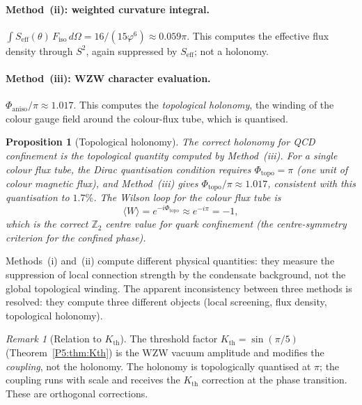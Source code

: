 \documentclass[11pt,a4paper]{article}
\newtheorem{proposition}[theorem]{Proposition}
\theoremstyle{definition}
\theoremstyle{remark}
\newtheorem{remark}[theorem]{Remark}
\newcommand{\vp}{\varphi}
\begin{document}
\paragraph{Method~(ii): weighted curvature integral.}
$\int S_{\mathrm{eff}}(\theta)\,F_{\mathrm{iso}}\,d\Omega
= 16/(15\vp^6)\approx0.059\pi$.
This computes the effective flux density through $S^2$, again
suppressed by $S_{\mathrm{eff}}$; not a holonomy.

\paragraph{Method~(iii): WZW character evaluation.}
$\Phi_{\mathrm{aniso}}/\pi\approx1.017$.
This computes the \emph{topological holonomy},  the winding of the
colour gauge field around the colour-flux tube, which is quantised.

\begin{proposition}[Topological holonomy]
\label{P5:prop:holonomy}
The correct holonomy for QCD confinement is the topological quantity
computed by Method~(iii).
For a single colour flux tube, the Dirac quantisation condition
requires $\Phi_{\mathrm{topo}} = \pi$ (one unit of colour magnetic
flux), and Method~(iii) gives $\Phi_{\mathrm{topo}}/\pi\approx1.017$,
consistent with this quantisation to $1.7\%$.
The Wilson loop for the colour flux tube is
\begin{equation}
  \langle W\rangle
  = e^{-i\Phi_{\mathrm{topo}}}
  \approx e^{-i\pi}
  = -1,
  \label{P5:eq:Wilson_loop}
\end{equation}
which is the correct $\mathbb{Z}_2$ centre value for quark confinement
(the centre-symmetry criterion for the confined phase).
\end{proposition}

\noindent
Methods~(i) and~(ii) compute different physical quantities: they measure
the suppression of local connection strength by the condensate background,
not the global topological winding.
The apparent inconsistency between three methods is resolved:
they compute three different objects (local screening, flux density,
topological holonomy).

\begin{remark}[Relation to $K_{\mathrm{th}}$]
\label{P5:rem:kth_relation}
The threshold factor $K_{\mathrm{th}}=\sin(\pi/5)$ (Theorem~\ref{P5:thm:Kth})
is the WZW vacuum amplitude and modifies the \emph{coupling}, not the
holonomy.  The holonomy is topologically quantised at $\pi$; the
coupling runs with scale and receives the $K_{\mathrm{th}}$ correction
at the phase transition.  These are orthogonal corrections.
\end{remark}
\end{document}
